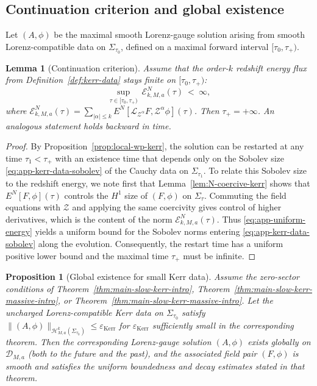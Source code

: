 \documentclass[11pt]{article}
\numberwithin{equation}{section}
\theoremstyle{plain}
\newtheorem{proposition}[theorem]{Proposition}
\newtheorem{lemma}[theorem]{Lemma}
\theoremstyle{definition}
\theoremstyle{remark}
\begin{document}
\subsection{Continuation criterion and global existence}\label{app:kerr-continuation}

Let $(A,\phi)$ be the maximal smooth Lorenz-gauge solution arising from smooth Lorenz-compatible data on $\Sigma_{\tau_0}$, defined on a maximal forward interval $[\tau_0,\tau_+)$.

\begin{lemma}[Continuation criterion]\label{lem:continuation-kerr}
Assume that the order-$k$ redshift energy flux from Definition~\ref{def:kerr-data} stays finite on $[\tau_0,\tau_+)$:
\begin{equation}\label{eq:app-uniform-energy}
\sup_{\tau\in[\tau_{0},\tau_{+})}\ \mathcal E^{N}_{k,M,a}(\tau)\ <\ \infty,
\end{equation}
where $\mathcal E^{N}_{k,M,a}(\tau)=\sum_{|\alpha|\le k}E^{N}[\mathcal L_{\mathcal Z^\alpha}F,\mathcal Z^\alpha\phi](\tau)$.
Then $\tau_{+}=+\infty$.
An analogous statement holds backward in time.
\end{lemma}

\begin{proof}
By Proposition~\ref{prop:local-wp-kerr}, the solution can be restarted at any time $\tau_1<\tau_+$ with an existence time that depends only on the Sobolev size
\eqref{eq:app-kerr-data-sobolev} of the Cauchy data on $\Sigma_{\tau_1}$.
To relate this Sobolev size to the redshift energy, we note first that Lemma~\ref{lem:N-coercive-kerr} shows that $E^{N}[F,\phi](\tau)$ controls the $H^1$ size of $(F,\phi)$ on $\Sigma_\tau$.
Commuting the field equations with $\mathcal Z$ and applying the same coercivity gives control of higher derivatives, which is the content of the norm
$\mathcal E^{N}_{k,M,a}(\tau)$.
Thus \eqref{eq:app-uniform-energy} yields a uniform bound for the Sobolev norms entering \eqref{eq:app-kerr-data-sobolev} along the evolution.
Consequently, the restart time has a uniform positive lower bound and the maximal time $\tau_+$ must be infinite.
\end{proof}

\begin{proposition}[Global existence for small Kerr data]\label{prop:global-existence-kerr}
Assume the zero-sector conditions of Theorem~\ref{thm:main-slow-kerr-intro}, Theorem~\ref{thm:main-slow-kerr-massive-intro}, or Theorem~\ref{thm:main-slow-kerr-massive-intro}.
Let the uncharged Lorenz-compatible Kerr data on $\Sigma_{\tau_{0}}$ satisfy
$\|(A,\phi)\|_{\mathcal H^{k}_{M,a}(\Sigma_{\tau_{0}})}\le \varepsilon_{\mathrm{Kerr}}$
for $\varepsilon_{\mathrm{Kerr}}$ sufficiently small in the corresponding theorem.
Then the corresponding Lorenz-gauge solution $(A,\phi)$ exists globally on $\mathcal D_{M,a}$ (both to the future and the past),
and the associated field pair $(F,\phi)$ is smooth and satisfies the uniform boundedness and decay estimates stated in that theorem.
\end{proposition}
\end{document}
